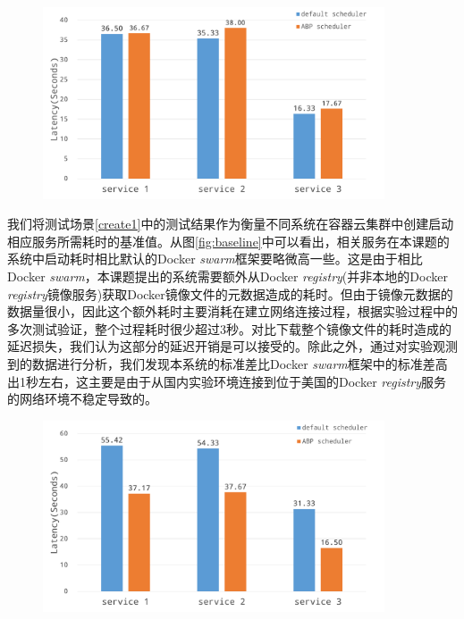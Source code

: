 \begin{figure}[htbp]
\centering
\includegraphics[width=0.9\textwidth]{./figure/baseline}
\end{figure}

我们将测试场景\ref{create1}中的测试结果作为衡量不同系统在容器云集群中创建启动相应服务所需耗时的基准值。从图\ref{fig:baseline}中可以看出，相关服务在本课题的系统中启动耗时相比默认的Docker \emph{swarm}框架要略微高一些。这是由于相比Docker \emph{swarm}，本课题提出的系统需要额外从Docker \emph{registry}(并非本地的Docker \emph{registry}镜像服务)获取Docker镜像文件的元数据造成的耗时。但由于镜像元数据的数据量很小，因此这个额外耗时主要消耗在建立网络连接过程，根据实验过程中的多次测试验证，整个过程耗时很少超过3秒。对比下载整个镜像文件的耗时造成的延迟损失，我们认为这部分的延迟开销是可以接受的。除此之外，通过对实验观测到的数据进行分析，我们发现本系统的标准差比Docker \emph{swarm}框架中的标准差高出1秒左右，这主要是由于从国内实验环境连接到位于美国的Docker \emph{registry}服务的网络环境不稳定导致的。

\begin{figure}[htbp]
\centering
\includegraphics[width=0.9\textwidth]{./figure/4ins2rep}
\end{figure}

